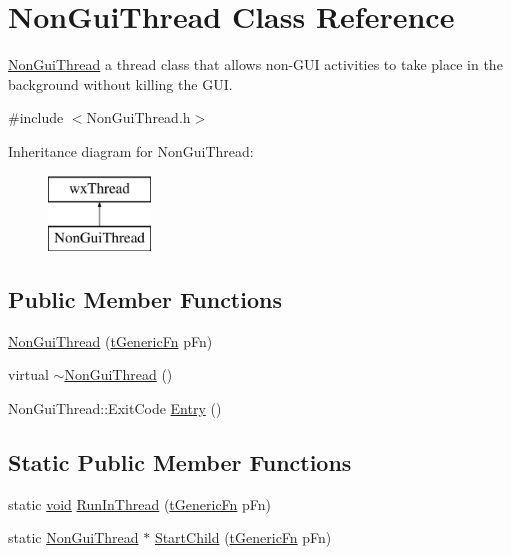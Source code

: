 \hypertarget{class_non_gui_thread}{}\section{Non\+Gui\+Thread Class Reference}
\label{class_non_gui_thread}


\hyperlink{class_non_gui_thread}{Non\+Gui\+Thread} a thread class that allows non-\/\+G\+UI activities to take place in the background without killing the G\+UI.  




{\ttfamily \#include $<$Non\+Gui\+Thread.\+h$>$}

Inheritance diagram for Non\+Gui\+Thread\+:\begin{figure}[H]
\begin{center}
\leavevmode
\includegraphics[height=2.000000cm]{class_non_gui_thread}
\end{center}
\end{figure}
\subsection*{Public Member Functions}
\begin{DoxyCompactItemize}
\item 
\hyperlink{class_non_gui_thread_a657678c4e1caffbb1c4820bee794439c}{Non\+Gui\+Thread} (\hyperlink{_non_gui_thread_8h_a808f4198a645760bf56c796af7c6b8ed}{t\+Generic\+Fn} p\+Fn)
\item 
virtual \hyperlink{class_non_gui_thread_a1d2bc48d90db8394bb3dce578074486f}{$\sim$\+Non\+Gui\+Thread} ()
\item 
Non\+Gui\+Thread\+::\+Exit\+Code \hyperlink{class_non_gui_thread_a626dba29181717d35ccb0a80a1030674}{Entry} ()
\end{DoxyCompactItemize}
\subsection*{Static Public Member Functions}
\begin{DoxyCompactItemize}
\item 
static \hyperlink{sound_8c_ae35f5844602719cf66324f4de2a658b3}{void} \hyperlink{class_non_gui_thread_a8e60ea51628af5c82d66ecfa6bf53427}{Run\+In\+Thread} (\hyperlink{_non_gui_thread_8h_a808f4198a645760bf56c796af7c6b8ed}{t\+Generic\+Fn} p\+Fn)
\item 
static \hyperlink{class_non_gui_thread}{Non\+Gui\+Thread} $\ast$ \hyperlink{class_non_gui_thread_a236a636ef6c007a648efeec2bda5e38a}{Start\+Child} (\hyperlink{_non_gui_thread_8h_a808f4198a645760bf56c796af7c6b8ed}{t\+Generic\+Fn} p\+Fn)
\end{DoxyCompactItemize}
